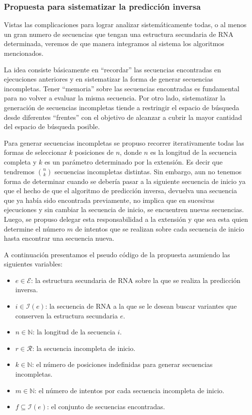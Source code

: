\subsubsection{Propuesta para sistematizar la predicci\'on inversa}

Vistas las complicaciones para lograr analizar sistem\'aticamente todas, o al
menos un gran numero de secuencias que tengan una estructura secundaria de
\ac{RNA} determinada, veremos de que manera integramos al sistema los algoritmos
mencionados.

La idea consiste b\'asicamente en ``recordar'' las secuencias encontradas en
ejecuciones anteriores y en sistematizar la forma de generar secuencias
incompletas. Tener ``memoria'' sobre las secuencias encontradas es fundamental
para no volver a evaluar la misma secuencia. Por otro lado, sistematizar la
generaci\'on de secuencias incompletas tiende a restringir el espacio de
b\'usqueda desde diferentes ``frentes'' con el objetivo de alcanzar a cubrir la
mayor cantidad del espacio de b\'usqueda posible.

Para generar secuencias incompletas se propuso recorrer iterativamente todas
las formas de seleccionar $k$ posiciones de $n$, donde $n$ es la longitud de la
secuencia completa y $k$ es un par\'ametro determinado por la extensi\'on. Es
decir que tendremos $n \choose k$ secuencias incompletas distintas. Sin
embargo, aun no tenemos forma de determinar cuando se deber\'ia pasar a la
siguiente secuencia de inicio ya que el hecho de que el algoritmo de
predicci\'on inversa, devuelva una secuencia que ya hab\'ia sido encontrada
previamente, no implica que en sucesivas ejecuciones y sin cambiar la secuencia
de inicio, se encuentren nuevas secuencias. Luego, se propuso delegar esta
responsabilidad a la extensi\'on y que sea esta quien determine el n\'umero $m$
de intentos que se realizan sobre cada secuencia de inicio hasta encontrar una
secuencia nueva.

A continuaci\'on presentamos el pseudo c\'odigo de la propuesta asumiendo las
siguientes variables:
\begin{itemize}
 \item $e \in \mathcal{E}$: la estructura secundaria de \ac{RNA} sobre la que se
realiza la predicci\'on inversa.
 \item $i \in \mathcal{I}(e)$: la secuencia de \ac{RNA} a la que se le desean
buscar variantes que conserven la estructura secundaria $e$.
 \item $n \in \mathbb{N}$: la longitud de la secuencia $i$.
 \item $r \in \mathcal{R}$: la secuencia incompleta de inicio.
 \item $k \in \mathbb{N}$: el n\'umero de posiciones indefinidas para generar
secuencias incompletas.
 \item $m \in \mathbb{N}$: el n\'umero de intentos por cada secuencia incompleta
de inicio.
 \item $f \subseteq \mathcal{I}(e)$: el conjunto de secuencias encontradas.
\end{itemize}

